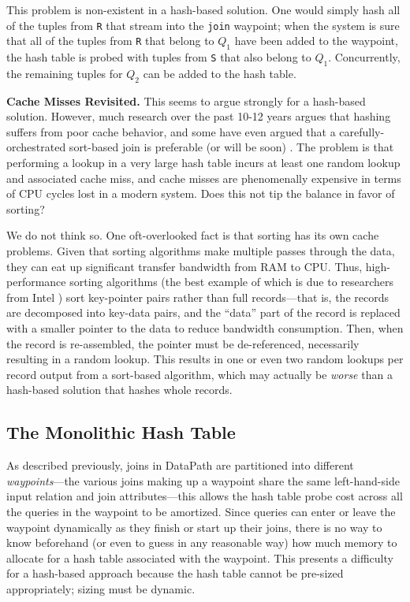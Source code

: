 \documentclass{sig-alternate}
\renewcommand\:{\colon} %
\begin{document}
This problem is non-existent in a hash-based solution.
One would simply hash all of the tuples from \texttt{R} that stream into the \texttt{join} waypoint; when the system is sure that all of
the tuples from \texttt{R} that belong to $Q_1$ have been added to the waypoint, the hash table is probed with tuples
from \texttt{S} that also belong to $Q_1$.  Concurrently, the remaining tuples for $Q_2$ can be added to the hash table.

\vspace{5 pt}
\noindent
\textbf{Cache Misses Revisited.}
This seems to argue strongly for a hash-based solution.  However, much research over the past 10-12 years argues that
hashing suffers from poor cache behavior, and some have even argued that a carefully-orchestrated sort-based join
is preferable (or will be soon) \cite{}.  
The problem is that performing a lookup in a very large
hash table incurs at least one random lookup and associated cache miss, and cache misses are phenomenally expensive in terms of CPU cycles lost in a
modern system.  
Does this not tip the balance in favor of sorting?

We do not think so.
One oft-overlooked fact is that sorting has its own cache
problems.  Given that sorting algorithms make multiple passes through the data, they can eat up significant
transfer bandwidth from RAM to CPU.
Thus, high-performance sorting algorithms (the best example of which is due to researchers from Intel \cite{}) sort key-pointer
pairs rather than full records---that is, 
the records are decomposed into key-data pairs, and the ``data'' part of the record is replaced with a smaller
pointer to the data to reduce bandwidth consumption.
Then, when the record is re-assembled, the pointer must be de-referenced, necessarily resulting in a random lookup.  
This results in one or even two random lookups per record output from a sort-based algorithm, which may actually be
\emph{worse} than a hash-based solution that hashes whole records.

\subsection{The Monolithic Hash Table}

As described previously, joins in DataPath are partitioned into
different \emph{waypoints}---the various joins making up a waypoint share the same left-hand-side input relation
and join attributes---this allows the hash table probe cost across all the queries in the waypoint to be amortized.  
Since queries can enter or leave the waypoint dynamically as they finish or start up their joins, there is no way to
know beforehand (or even to guess in any reasonable way) how much memory to allocate for a hash table associated with the waypoint.
This presents a difficulty for a hash-based approach because the hash table cannot be pre-sized appropriately;
sizing must be dynamic.
\end{document}
